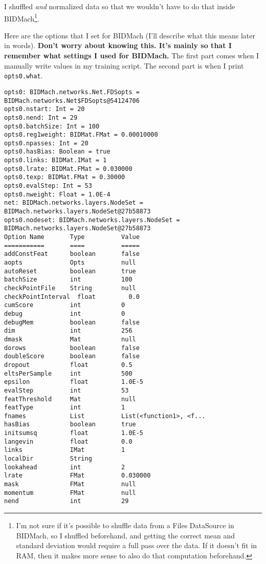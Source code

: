 \documentclass[a4paper, 11pt]{article}
\begin{document}
I shuffled \emph{and} normalized data so that we wouldn't have to do that inside
BIDMach\footnote{I'm not sure if it's possible to shuffle data from a Files DataSource in BIDMach,
so I shuffled beforehand, and getting the correct mean and standard deviation would require a full
pass over the data. If it doesn't fit in RAM, then it makes more sense to also do that computation
beforehand.}.

Here are the options that I set for BIDMach (I'll describe what this means later in words).
\textbf{Don't worry about knowing this. It's mainly so that I remember what settings I used for
BIDMach.} The first part comes when I manually write values in my training script. The second part
is when I print \texttt{opts0.what}.

\footnotesize
\begin{verbatim}
opts0: BIDMach.networks.Net.FDSopts = BIDMach.networks.Net$FDSopts@54124706
opts0.nstart: Int = 20
opts0.nend: Int = 29
opts0.batchSize: Int = 100
opts0.reg1weight: BIDMat.FMat = 0.00010000
opts0.npasses: Int = 20
opts0.hasBias: Boolean = true
opts0.links: BIDMat.IMat = 1
opts0.lrate: BIDMat.FMat = 0.030000
opts0.texp: BIDMat.FMat = 0.30000
opts0.evalStep: Int = 53
opts0.nweight: Float = 1.0E-4
net: BIDMach.networks.layers.NodeSet = BIDMach.networks.layers.NodeSet@27b58873
opts0.nodeset: BIDMach.networks.layers.NodeSet = BIDMach.networks.layers.NodeSet@27b58873
Option Name       Type          Value
===========       ====          =====
addConstFeat      boolean       false
aopts             Opts          null
autoReset         boolean       true
batchSize         int           100
checkPointFile    String        null
checkPointInterval  float         0.0
cumScore          int           0
debug             int           0
debugMem          boolean       false
dim               int           256
dmask             Mat           null
dorows            boolean       false
doubleScore       boolean       false
dropout           float         0.5
eltsPerSample     int           500
epsilon           float         1.0E-5
evalStep          int           53
featThreshold     Mat           null
featType          int           1
fnames            List          List(<function1>, <f...
hasBias           boolean       true
initsumsq         float         1.0E-5
langevin          float         0.0
links             IMat          1
localDir          String        
lookahead         int           2
lrate             FMat          0.030000
mask              FMat          null
momentum          FMat          null
nend              int           29

\end{verbatim}
\end{document}
